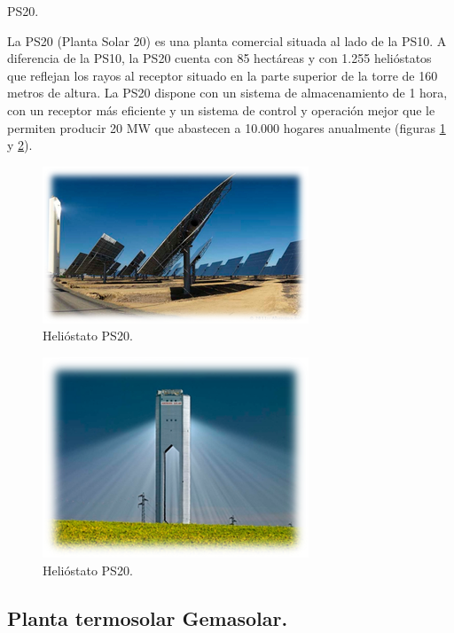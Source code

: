 \cite{JonathanWebSite}



PS20.

La PS20 (Planta Solar 20) es una planta comercial situada al lado de la PS10.
A diferencia de la PS10, la PS20 cuenta con 85 hectáreas y con 1.255 helióstatos que reflejan los rayos al receptor situado en la parte superior de la torre de 160 metros de altura.
La PS20 dispone con un sistema de almacenamiento de 1 hora, con un receptor más eficiente y un sistema de control y operación mejor que le permiten producir 20 MW que abastecen a 10.000 hogares anualmente (figuras \ref{fig:FotosPaginasWebHeliostatos/unnamed(2).png} y \ref{fig:FotosPaginasWebHeliostatos/unnamed(3).png}).

\begin{figure}[h!]
  	\centering
	\includegraphics[scale=1]{FotosPaginasWebHeliostatos/unnamed(2).png}
	\caption{Helióstato PS20.
	\label{fig:FotosPaginasWebHeliostatos/unnamed(2).png}}
\end{figure}

\begin{figure}[h!]
  	\centering
	\includegraphics[scale=1]{FotosPaginasWebHeliostatos/unnamed(3).png}
	\caption{Helióstato PS20.
	\label{fig:FotosPaginasWebHeliostatos/unnamed(3).png}}
\end{figure}

\cite{ValenticampderrosWebSite}

\subsection{Planta termosolar Gemasolar.}

